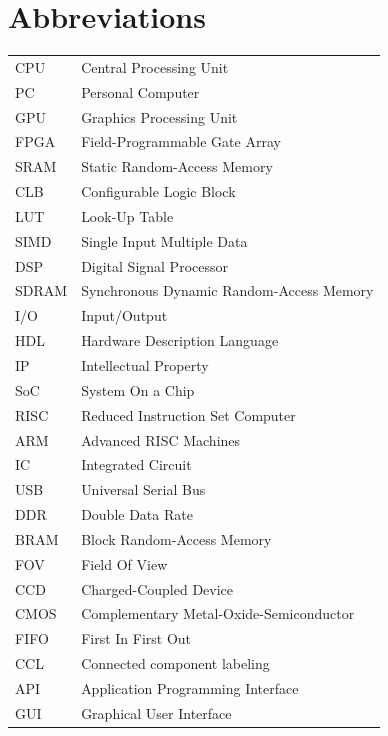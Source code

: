 \documentclass[12pt]{report}
\begin{document}
\section*{Abbreviations}
\begin{table}[h]
    \begin{tabular}{ll}
        CPU&Central Processing Unit\\
        PC&Personal Computer\\
        GPU&Graphics Processing Unit\\
        FPGA&Field-Programmable Gate Array\\
        SRAM&Static Random-Access Memory\\
        CLB&Configurable Logic Block\\
        LUT&Look-Up Table\\
        SIMD&Single Input Multiple Data\\
        DSP&Digital Signal Processor\\
        SDRAM&Synchronous Dynamic Random-Access Memory\\
        I/O&Input/Output\\
        HDL&Hardware Description Language\\
        IP&Intellectual Property\\
        SoC&System On a Chip\\
        RISC&Reduced Instruction Set Computer\\
        ARM&Advanced RISC Machines\\
        IC&Integrated Circuit\\
        USB&Universal Serial Bus\\
        DDR&Double Data Rate\\
        BRAM&Block Random-Access Memory\\
        FOV&Field Of View\\
        CCD&Charged-Coupled Device\\
        CMOS&Complementary Metal-Oxide-Semiconductor\\
        FIFO&First In First Out\\
        CCL&Connected component labeling\\
        API&Application Programming Interface\\
        GUI&Graphical User Interface\\
    \end{tabular}
\end{table}
\tableofcontents
\listoffigures
\listoftables
\end{document}
